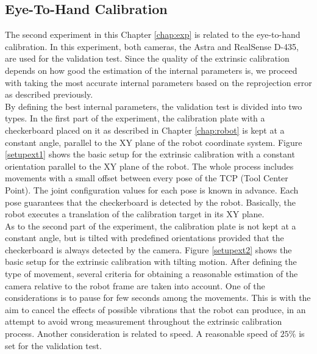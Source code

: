 \subsection{Eye-To-Hand Calibration}

The second experiment in this Chapter \ref{chap:exp} is related to the eye-to-hand calibration. In this experiment, both cameras, the Astra and RealSense D-435, are used for the validation test. Since the quality of the extrinsic calibration depends on how good the estimation of the internal parameters is, we proceed with taking the most accurate internal parameters based on the reprojection error as described previously. \\
By defining the best internal parameters, the validation test is divided into two types. In the first part of the experiment, the calibration plate with a checkerboard placed on it as described in Chapter \ref{chap:robot} is kept at a constant angle, parallel to the XY plane of the robot coordinate system. Figure \ref{setupext1} shows the basic setup for the extrinsic calibration with a constant orientation parallel to the XY plane of the robot. The whole process includes movements with a small offset between every pose of the TCP (Tool Center Point). The joint configuration values for each pose is known in advance. Each pose guarantees that the checkerboard is detected by the robot. Basically, the robot executes a translation of the calibration target in its XY plane.\\ 

As to the second part of the experiment, the calibration plate is not kept at  a constant angle, but is tilted with predefined orientations provided that the checkerboard is always detected by the camera. Figure \ref{setupext2} shows the basic setup for the extrinsic calibration with tilting motion. After defining the type of movement, several criteria for obtaining a reasonable estimation of the camera relative to the robot frame are taken into account. One of the considerations is to pause for few seconds among the movements. This is with the aim to cancel the effects of possible vibrations that the robot can produce, in an attempt to avoid wrong measurement throughout the extrinsic calibration process. Another consideration is related to speed. A reasonable speed of $25\%$ is set for the validation test. \\

